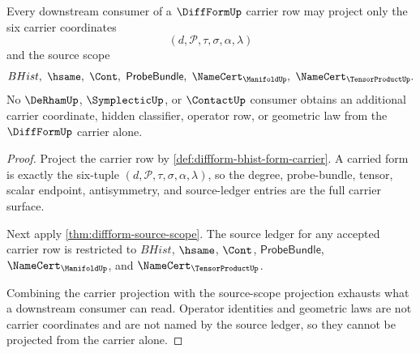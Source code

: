 \begin{theorem}
\label{thm:diffform-downstream-carrier-source-obligation}
Every downstream consumer of a $\DiffFormUp$ carrier row may project only the
six carrier coordinates
$$
(d,\mathcal{P},\tau,\sigma,\alpha,\lambda)
$$
and the source scope
$$
BHist,\ \hsame,\ \Cont,\ \mathsf{ProbeBundle},\
\NameCert_{\ManifoldUp},\ \NameCert_{\TensorProductUp}.
$$
No $\DeRhamUp$, $\SymplecticUp$, or $\ContactUp$ consumer obtains an additional
carrier coordinate, hidden classifier, operator row, or geometric law from the
$\DiffFormUp$ carrier alone.
\end{theorem}
\begin{proof}
Project the carrier row by
\autoref{def:diffform-bhist-form-carrier}. A carried form is exactly the
six-tuple $(d,\mathcal{P},\tau,\sigma,\alpha,\lambda)$, so the degree,
probe-bundle, tensor, scalar endpoint, antisymmetry, and source-ledger entries
are the full carrier surface.

Next apply \autoref{thm:diffform-source-scope}. The source ledger for any
accepted carrier row is restricted to $BHist$, $\hsame$, $\Cont$,
$\mathsf{ProbeBundle}$, $\NameCert_{\ManifoldUp}$, and
$\NameCert_{\TensorProductUp}$.

Combining the carrier projection with the source-scope projection exhausts
what a downstream consumer can read. Operator identities and geometric laws
are not carrier coordinates and are not named by the source ledger, so they
cannot be projected from the carrier alone.
\end{proof}

